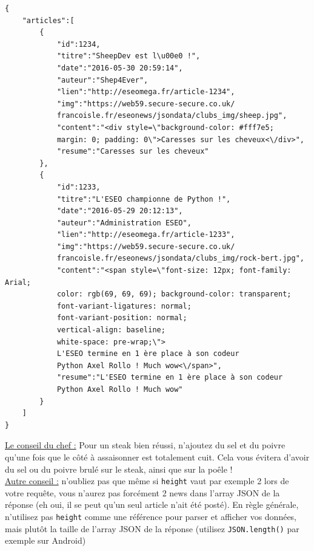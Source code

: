 \documentclass[12pt,a4paper,oneside]{report}
\begin{document}
\begin{verbatim}
{
    "articles":[
        {
            "id":1234,
            "titre":"SheepDev est l\u00e0 !",
            "date":"2016-05-30 20:59:14",
            "auteur":"Shep4Ever",
            "lien":"http://eseomega.fr/article-1234",
            "img":"https://web59.secure-secure.co.uk/
            francoisle.fr/eseonews/jsondata/clubs_img/sheep.jpg",
            "content":"<div style=\"background-color: #fff7e5; 
            margin: 0; padding: 0\">Caresses sur les cheveux<\/div>",
            "resume":"Caresses sur les cheveux"
        },
        {
            "id":1233,
            "titre":"L'ESEO championne de Python !",
            "date":"2016-05-29 20:12:13",
            "auteur":"Administration ESEO",
            "lien":"http://eseomega.fr/article-1233",
            "img":"https://web59.secure-secure.co.uk/
            francoisle.fr/eseonews/jsondata/clubs_img/rock-bert.jpg",
            "content":"<span style=\"font-size: 12px; font-family: Arial; 
            color: rgb(69, 69, 69); background-color: transparent; 
            font-variant-ligatures: normal; 
            font-variant-position: normal;
            vertical-align: baseline; 
            white-space: pre-wrap;\">
            L'ESEO termine en 1 ère place à son codeur 
            Python Axel Rollo ! Much wow<\/span>",
            "resume":"L'ESEO termine en 1 ère place à son codeur
            Python Axel Rollo ! Much wow"
        }
    ]
}
\end{verbatim}

\noindent \underline{Le conseil du chef :} Pour un steak bien réussi, n'ajoutez du sel et du poivre qu'une fois que le côté à assaisonner est totalement cuit. Cela vous évitera d'avoir du sel ou du poivre brulé sur le steak, ainsi que sur la poêle !\\

\noindent \underline{Autre conseil :} n'oubliez pas que même si \texttt{height} vaut par exemple 2 lors de votre requête, vous n'aurez pas forcément 2 news dans l'array JSON de la réponse (eh oui, il se peut qu'un seul article n'ait été posté). En règle générale, n'utilisez pas \texttt{height} comme une référence pour parser et afficher vos données, mais plutôt la taille de l'array JSON de la réponse (utilisez \texttt{JSON.length()} par exemple sur Android)
\end{document}
